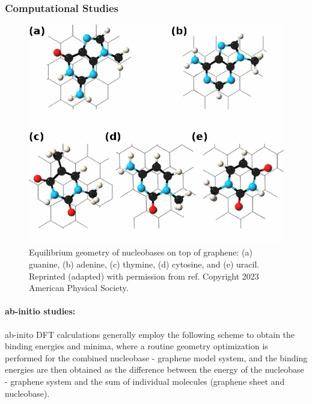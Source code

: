\subsubsection{Computational Studies}
\begin{figure}
    \centering
    \includegraphics{Introduction/Figures/Figure2.png}
    \caption[Equilibrium geometry of nucleobases on top of graphene: (a) guanine, (b) adenine, (c) thymine, (d) cytosine, and (e) uracil from ab-initio calculations]{Equilibrium geometry of nucleobases on top of graphene: (a) guanine, (b) adenine, (c) thymine, (d) cytosine, and (e) uracil. Reprinted (adapted) with permission from ref.\supercite{gowtham_physisorption_2007} Copyright 2023 American Physical Society.}
    \label{fig:figure2}
\end{figure}

\paragraph{ab-initio studies:} ab-inito DFT calculations generally employ the following scheme to obtain the binding energies and minima, where a routine geometry optimization is performed for the combined nucleobase - graphene model system, and the binding energies are then obtained as the difference between the energy of the nucleobase - graphene system and the sum of individual molecules (graphene sheet and nucleobase).

